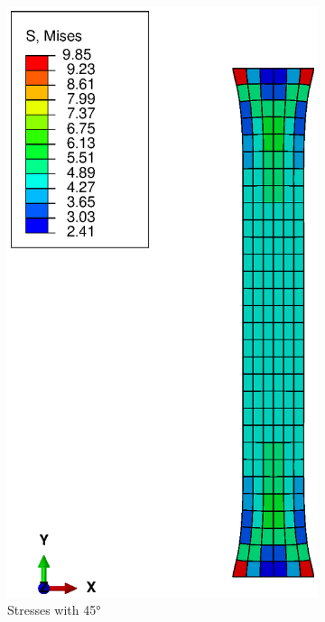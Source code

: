 \documentclass[12pt]{article}
\begin{document}
\begin{figure}[!htb]
  \centering
  \begin{subfigure}{.5\textwidth}
    \centering
    \includegraphics[width=0.95\linewidth]{pics/s_mises_45}
    \caption{Stresses with \ang{45}}
  \end{subfigure}%
  \begin{subfigure}{.5\textwidth}
    \centering

\end{subfigure}
\end{figure}
\end{document}
